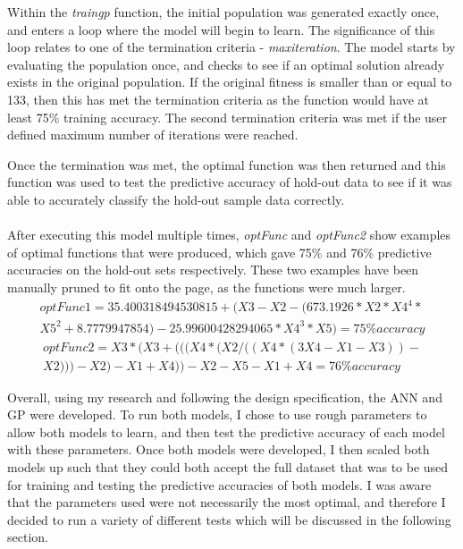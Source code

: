 \documentclass[11pt]{article}
\begin{document}
Within the \textit{train\textunderscore gp} function, the initial population was generated exactly once, and enters a loop where the model will begin to learn. The significance of this loop relates to one of the termination criteria - \textit{max\textunderscore iteration}. The model starts by evaluating the population once, and checks to see if an optimal solution already exists in the original population. If the original fitness is smaller than or equal to 133, then this has met the termination criteria as the function would have at least 75\% training accuracy. The second termination criteria was met if the user defined maximum number of iterations were reached. 

Once the termination was met, the optimal function was then returned and this function was used to test the predictive accuracy of hold-out data to see if it was able to accurately classify the hold-out sample data correctly. \\\\
After executing this model multiple times, \textit{optFunc} and \textit{optFunc2} show examples of optimal functions that were produced, which gave 75\% and 76\% predictive accuracies on the hold-out sets respectively.  These two examples have been manually pruned to fit onto the page, as the functions were much larger. 
\begin{align*}
optFunc1=  35.400318494530815+(X3-X2-(673.1926*X2*X4^4*\\
X5^2+8.7779947854)-25.99600428294065*X4^3*X5) = 75\%  accuracy
\end{align*}
\begin{align*}
optFunc2 = X3*(X3+(((X4*(X2/((X4*(3X4-X1-X3))-\\
X2)))-X2)-X1+X4))-X2-X5-X1+X4 = 76\%  accuracy
\end{align*}

Overall, using my research and following the design specification, the ANN and GP were developed. To run both models, I chose to use rough parameters to allow both models to learn, and then test the predictive accuracy of each model with these parameters. Once both models were developed, I then scaled both models up such that they could both accept the full dataset that was to be used for training and testing the predictive accuracies of both models. I was aware that the parameters used were not necessarily the most optimal, and therefore I decided to run a variety of different tests which will be discussed in the following section.
\end{document}
